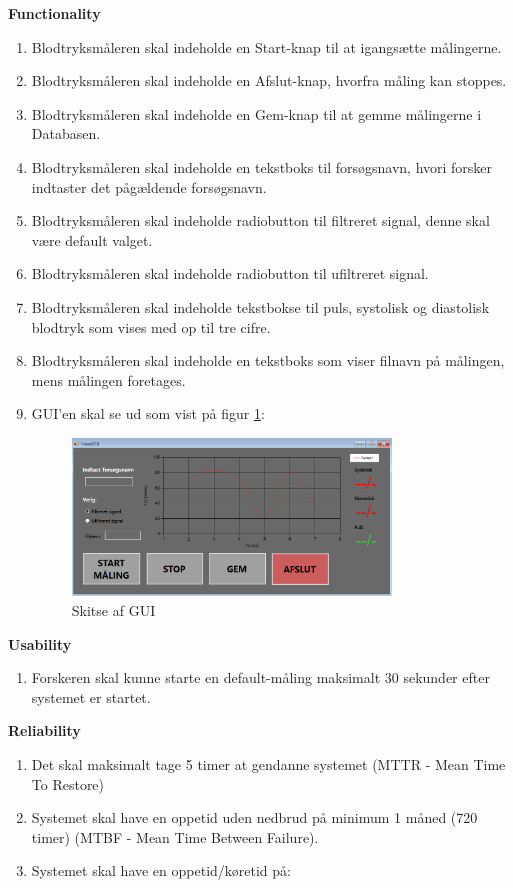 \textbf{Functionality}
\begin{enumerate}
\item Blodtryksmåleren skal indeholde en Start-knap til at igangsætte målingerne. 
\item Blodtryksmåleren skal indeholde en Afslut-knap, hvorfra måling kan stoppes.
\item Blodtryksmåleren skal indeholde en Gem-knap til at gemme målingerne i Databasen.
\item Blodtryksmåleren skal indeholde en tekstboks til forsøgsnavn, hvori forsker indtaster det pågældende forsøgsnavn.
\item Blodtryksmåleren skal indeholde radiobutton til filtreret signal, denne skal være default valget.
\item Blodtryksmåleren skal indeholde radiobutton til ufiltreret signal.
\item Blodtryksmåleren skal indeholde tekstbokse til puls, systolisk og diastolisk blodtryk som vises med op til tre cifre.
\item Blodtryksmåleren skal indeholde en tekstboks som viser filnavn på målingen, mens målingen foretages. 
\item GUI’en skal se ud som vist på figur \ref{fig:Skitse af GUI}:
\begin{figure}[H]
	\centering
	\includegraphics[width=0.8\textwidth]{Figurer/GUI}
	\caption{Skitse af GUI}
	\label{fig:Skitse af GUI}
\end{figure}

\end{enumerate}

\textbf{Usability}
\begin{enumerate}
\item Forskeren skal kunne starte en default-måling maksimalt 30 sekunder efter systemet er startet.
\end{enumerate}

\textbf{Reliability}
\begin{enumerate}
\item Det skal maksimalt tage 5 timer at gendanne systemet (MTTR - Mean Time To Restore)
\item Systemet skal have en oppetid uden nedbrud på minimum 1 måned (720 timer) (MTBF - Mean Time Between Failure).   
\item Systemet skal have en oppetid/køretid på: 
\end{enumerate}

